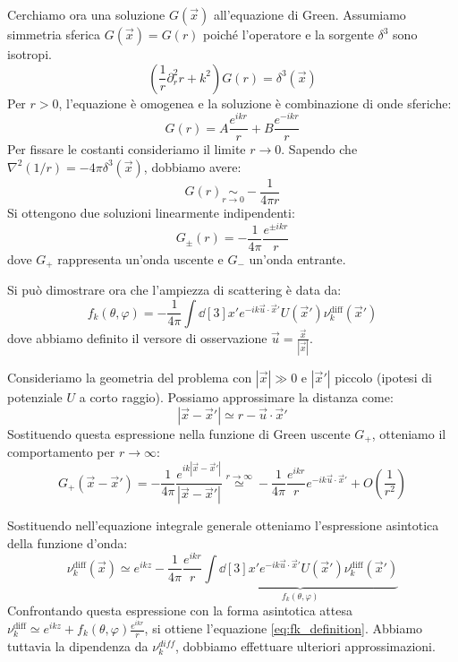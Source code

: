 Cerchiamo ora una soluzione \( G(\vec{x}) \) all'equazione di Green.
Assumiamo simmetria sferica \( G(\vec{x})=G(r) \) poiché l'operatore e la sorgente \( \delta^3 \) sono isotropi.
\begin{equation}
    \left( \frac{1}{r} \partial_r^2 r + k^2 \right) G(r) = \delta^3(\vec{x})
\end{equation}
Per \( r > 0 \), l'equazione è omogenea e la soluzione è combinazione di onde sferiche:
\[
    G(r) = A \frac{e^{ikr}}{r} + B \frac{e^{-ikr}}{r}
\]
Per fissare le costanti consideriamo il limite \( r \to 0 \). Sapendo che \( \nabla^2(1/r) = -4\pi \delta^3(\vec{x}) \), dobbiamo avere:
\[
    G(r) \underset{r \to 0}{\sim} -\frac{1}{4\pi r}
\]
Si ottengono due soluzioni linearmente indipendenti:
\begin{equation}
    G_{\pm}(r) = -\frac{1}{4\pi} \frac{e^{\pm ikr}}{r}
\end{equation}
dove \( G_+ \) rappresenta un'onda uscente e \( G_- \) un'onda entrante.

Si può dimostrare ora che l'ampiezza di scattering è data da:
\begin{equation} \label{eq:fk_definition}
    f_k(\theta, \varphi) = -\frac{1}{4\pi} \int \dd[3]{x'} e^{-i k \vec{u} \cdot \vec{x}'} U(\vec{x}') \nu_k^{\text{diff}}(\vec{x}')
\end{equation}
dove abbiamo definito il versore di osservazione $\vec{u} = \frac{\vec{x}}{|\vec{x}|}$.


Consideriamo la geometria del problema con $|\vec{x}| \gg 0$ e $|\vec{x}'|$ piccolo (ipotesi di potenziale $U$ a corto raggio).
Possiamo approssimare la distanza come:
\[
    |\vec{x} - \vec{x}'| \simeq r - \vec{u} \cdot \vec{x}'
\]
Sostituendo questa espressione nella funzione di Green uscente $G_+$, otteniamo il comportamento per $r \to \infty$:
\[
    G_+(\vec{x}-\vec{x}') = -\frac{1}{4\pi} \frac{e^{ik|\vec{x}-\vec{x}'|}}{|\vec{x}-\vec{x}'|} 
    \overset{r \to \infty}{\simeq} 
    -\frac{1}{4\pi} \frac{e^{ikr}}{r} e^{-ik \vec{u} \cdot \vec{x}'} + O\left(\frac{1}{r^2}\right)
\]

Sostituendo nell'equazione integrale generale otteniamo l'espressione asintotica della funzione d'onda:
\[
    \nu_k^{\text{diff}}(\vec{x}) \simeq e^{ikz} - \frac{1}{4\pi} \frac{e^{ikr}}{r} \underbrace{\int \dd[3]{x'} e^{-ik \vec{u} \cdot \vec{x}'} U(\vec{x}') \nu_k^{\text{diff}}(\vec{x}')}_{f_k(\theta, \varphi)}
\]
Confrontando questa espressione con la forma asintotica attesa $\nu_k^{\text{diff}} \simeq e^{ikz} + f_k(\theta, \varphi)\frac{e^{ikr}}{r}$, si ottiene l'equazione \eqref{eq:fk_definition}. 
Abbiamo tuttavia la dipendenza da \(\nu^{diff}_k\), dobbiamo effettuare ulteriori approssimazioni.

